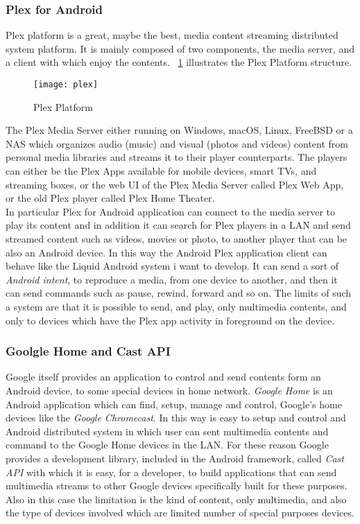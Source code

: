 \subsubsection{Plex for Android}
Plex platform is a great, maybe the best, media content streaming distributed system platform. It is mainly composed of two components, the media server, and a client with which enjoy the contents. \figurename~\ref{fig:4.1} illustrates the Plex Platform structure.
\begin{figure}[h]
	\centering
	\texttt{[image: plex]}
	\caption{Plex Platform}
	\label{fig:4.1}
\end{figure}
The Plex Media Server either running on Windows, macOS, Linux, FreeBSD or a NAS which organizes audio (music) and visual (photos and videos) content from personal media libraries and streams it to their player counterparts.
The players can either be the Plex Apps available for mobile devices, smart TVs, and streaming boxes, or the web UI of the Plex Media Server called Plex Web App, or the old Plex player called Plex Home Theater.\\
In particular Plex for Android application can connect to the media server to play its content and in addition it can search for Plex players in a LAN and send streamed content such as videos, movies or photo, to another player that can be also an Android device. In this way the Android Plex application client can behave like the Liquid Android system i want to develop. It can send a sort of \textit{Android intent}, to reproduce a media, from one device to another, and then it can send commands such as pause, rewind, forward and so on. The limits of such a system are that it is possible to send, and play, only multimedia contents, and only to devices which have the Plex app activity in foreground on the device.

\subsubsection{Goolgle Home and Cast API}
Google itself provides an application to control and send contents form an Android device, to some special devices in home network. \textit{Google Home} is an Android application which can find, setup, manage and control, Google's home devices like the \textit{Google Chromecast}. In this way is easy to setup and control and Android distributed system in which user can sent multimedia contents and command to the Google Home devices in the LAN. For these reason Google provides a development library, included in the Android framework, called \textit{Cast API} with which it is easy, for a developer, to build applications that can send multimedia streams to other Google devices specifically built for these purposes.\\
Also in this case the limitation is the kind of content, only multimedia, and also the type of devices involved which are limited number of special purposes devices.

